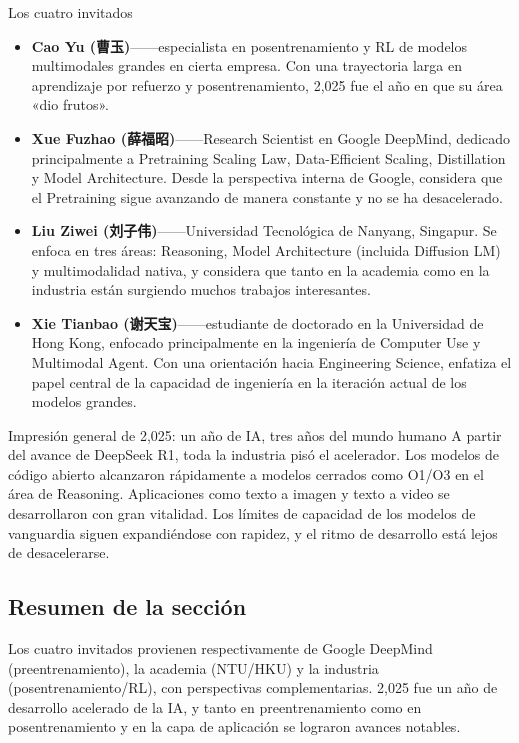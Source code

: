 \documentclass[a4paper]{article}
\begin{document}
\begin{knowledgebox}{Los cuatro invitados}
\begin{itemize}
  \item \textbf{Cao Yu (曹玉)}——especialista en posentrenamiento y RL de modelos multimodales grandes en cierta empresa. Con una trayectoria larga en aprendizaje por refuerzo y posentrenamiento, 2,025 fue el año en que su área «dio frutos».
  \item \textbf{Xue Fuzhao (薛福昭)}——Research Scientist en Google DeepMind, dedicado principalmente a Pretraining Scaling Law, Data-Efficient Scaling, Distillation y Model Architecture. Desde la perspectiva interna de Google, considera que el Pretraining sigue avanzando de manera constante y no se ha desacelerado.
  \item \textbf{Liu Ziwei (刘子伟)}——Universidad Tecnológica de Nanyang, Singapur. Se enfoca en tres áreas: Reasoning, Model Architecture (incluida Diffusion LM) y multimodalidad nativa, y considera que tanto en la academia como en la industria están surgiendo muchos trabajos interesantes.
  \item \textbf{Xie Tianbao (谢天宝)}——estudiante de doctorado en la Universidad de Hong Kong, enfocado principalmente en la ingeniería de Computer Use y Multimodal Agent. Con una orientación hacia Engineering Science, enfatiza el papel central de la capacidad de ingeniería en la iteración actual de los modelos grandes.
\end{itemize}
\end{knowledgebox}

\begin{importantbox}{Impresión general de 2,025: un año de IA, tres años del mundo humano}
A partir del avance de DeepSeek R1, toda la industria pisó el acelerador. Los modelos de código abierto alcanzaron rápidamente a modelos cerrados como O1/O3 en el área de Reasoning. Aplicaciones como texto a imagen y texto a video se desarrollaron con gran vitalidad. Los límites de capacidad de los modelos de vanguardia siguen expandiéndose con rapidez, y el ritmo de desarrollo está lejos de desacelerarse.
\end{importantbox}

\subsection{Resumen de la sección}
Los cuatro invitados provienen respectivamente de Google DeepMind (preentrenamiento), la academia (NTU/HKU) y la industria (posentrenamiento/RL), con perspectivas complementarias. 2,025 fue un año de desarrollo acelerado de la IA, y tanto en preentrenamiento como en posentrenamiento y en la capa de aplicación se lograron avances notables.
\end{document}
